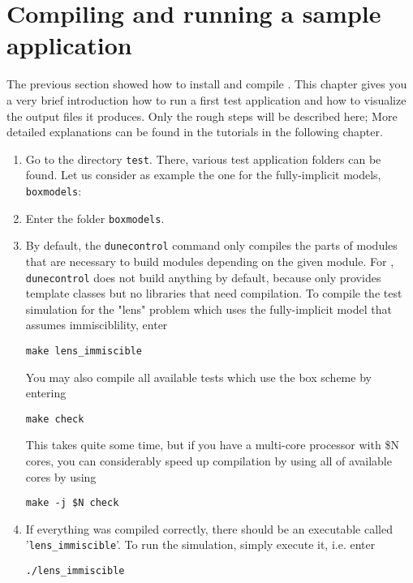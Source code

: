 \section[Quick start guide]{Compiling and running a sample application}
\label{quick-start-guide}

The previous section showed how to install and compile \eWoms. This
chapter gives you a very brief introduction how to run a first test
application and how to visualize the output files it produces. Only the
rough steps will be described here; More detailed explanations can be
found in the tutorials in the following chapter.

\begin{enumerate}
\item Go to the directory \texttt{test}. There, various test
  application folders can be found. Let us consider as example
  the one for the fully-implicit models, \texttt{boxmodels}:
\item Enter the folder \texttt{boxmodels}. 
\item By default, the \texttt{dunecontrol} command only compiles the
  parts of \Dune modules that are necessary to build modules depending
  on the given module. For \eWoms, \texttt{dunecontrol} does not build
  anything by default, because \eWoms only provides \Cplusplus
  template classes but no libraries that need compilation. To compile
  the test simulation for the "lens" problem which uses the fully-implicit 
  model that assumes immisciblility, enter
\begin{lstlisting}[style=Bash]
make lens_immiscible
\end{lstlisting}

You may also compile all available tests which use the box scheme by entering
\begin{lstlisting}[style=Bash]
make check
\end{lstlisting}

This takes quite some time, but if you have a multi-core processor
with \$N cores, you can considerably speed up compilation by using all
of available cores by using
\begin{lstlisting}[style=Bash]
make -j $N check
\end{lstlisting}

\item If everything was compiled correctly, there should be an
  executable called '\texttt{lens{\_}immiscible}'. To run the simulation,
  simply execute it, i.e. enter
\begin{lstlisting}[style=Bash]
./lens_immiscible
\end{lstlisting}


\end{enumerate}
